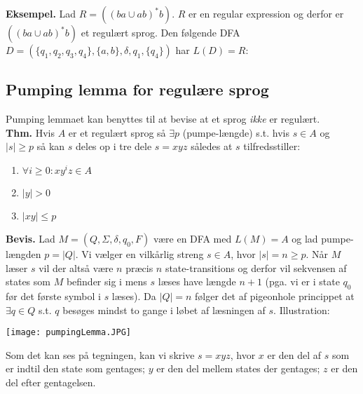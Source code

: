 \textbf{Eksempel.} Lad $R=((ba \cup ab)^*b)$. $R$ er en regular expression og derfor er $((ba \cup ab)^*b)$ et regulært sprog. Den følgende DFA $D=(\{q_1,q_2,q_3,q_4\},\{a,b\},\delta,q_1,\{q_4\})$ har $L(D)=R$:
\begin{center}
\end{center}

\subsection*{Pumping lemma for regulære sprog}

Pumping lemmaet kan benyttes til at bevise at et sprog \textit{ikke} er regulært. \\

\textbf{Thm.} Hvis $A$ er et regulært sprog så $\exists p$ (pumpe-længde) s.t. hvis $s \in A$ og $|s|\ge p$ så kan $s$ deles op i tre dele $s=xyz$ således at $s$ tilfredsstiller:
\begin{enumerate}
    \item $\forall i \ge 0: xy^i z \in A$
    \item $|y|>0$
    \item $|xy| \le p$
\end{enumerate}

\textbf{Bevis.} Lad $M=(Q, \Sigma, \delta, q_0, F)$ være en DFA med $L(M)=A$ og lad pumpe-længden $p=|Q|$. Vi vælger en vilkårlig streng $s \in A$, hvor $|s|=n\ge p$. Når $M$ læser $s$ vil der altså være $n$ præcis $n$ state-transitions og derfor vil sekvensen af states som $M$ befinder sig i mens $s$ læses have længde $n+1$ (pga. vi er i state $q_0$ før det første symbol i $s$ læses). Da $|Q| = n$ følger det af pigeonhole princippet at $\exists q \in Q$ s.t. $q$ besøges mindst to gange i løbet af læsningen af $s$. Illustration:    
\begin{center}
	\texttt{[image: pumpingLemma.JPG]}
\end{center}
Som det kan ses på tegningen, kan vi skrive $s=xyz$, hvor $x$ er den del af $s$ som er indtil den state som gentages; $y$ er den del mellem states der gentages; $z$ er den del efter gentagelsen. \\

